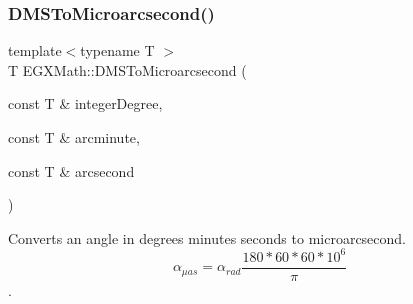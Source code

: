 \mbox{\label{group___e_g_x_math-_angle_conversions-_d_m_s_ga1230f4c81771a59d9973beb0e6747dbf}} 
\subsubsection{\texorpdfstring{D\+M\+S\+To\+Microarcsecond()}{DMSToMicroarcsecond()}}
{\footnotesize\ttfamily template$<$typename T $>$ \\
T E\+G\+X\+Math\+::\+D\+M\+S\+To\+Microarcsecond (\begin{DoxyParamCaption}\item[{const T \&}]{integer\+Degree,  }\item[{const T \&}]{arcminute,  }\item[{const T \&}]{arcsecond }\end{DoxyParamCaption})}



Converts an angle in degrees minutes seconds to microarcsecond. \[\alpha_{\mu as}=\alpha_{rad}\frac{180 * 60 * 60 * 10^6}{\pi}\]. 


